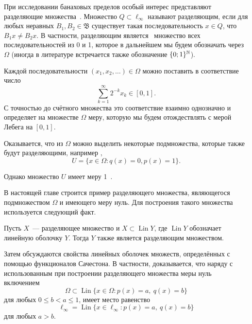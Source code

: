 При исследовании банаховых пределов особый интерес представляют разделяющие множества~\cite[\S 3]{Semenov2014geomprops}.
Множество $Q\subset\ell_\infty$ называют разделяющим, если
для любых неравных $B_1, B_2\in\mathfrak{B}$ существует такая последовательность $x\in Q$,
что $B_1 x \neq B_2 x$.
В частности, разделяющим является~\cite{semenov2010characteristic} множество всех последовательностей из 0 и 1,
которое в дальнейшем мы будем обозначать через $\Omega$
(иногда в литературе встречается также обозначение $\{0;1\}^{\mathbb{N}}$).

Каждой последовательности $(x_1, x_2, \dots)\in \Omega$ можно поставить в соответствие число
\begin{equation}\label{eq:bijection_omega_0_1}
	\sum_{k=1}^\infty 2^{-k} x_k \in [0,1]
	.
\end{equation}
С точностью до счётного множества это соответствие взаимно однозначно и определяет на множестве $\Omega$ меру,
которую мы будем отождествлять с мерой Лебега на $[0,1]$.

Оказывается, что из $\Omega$ можно выделить некоторые подмножества, которые также будут разделяющими,
например \cite[\S 3, Теорема 11]{Semenov2014geomprops},
\begin{equation}
	U = \{ x\in\Omega: q(x) = 0, p(x) = 1 \}
	.
\end{equation}

Однако множество $U$ имеет меру 1~\cite{semenov2010characteristic}.

В настоящей главе строится пример разделяющего множества,
являющегося подмножеством $\Omega$ и имеющего меру нуль.
Для построения такого множества используется следующий факт.

\begin{lemma}
	Пусть $X$~--- разделяющее множество и $X \subset \operatorname{Lin} Y$,
	где $\operatorname{Lin} Y$ обозначает линейную оболочку $Y$.
	Тогда $Y$ также является разделяющим множеством.
\end{lemma}

Затем обсуждаются свойства линейных оболочек множеств, определённых с помощью функционалов Сачестона.
В частности, доказывается,
что наряду с использованным при построении разделяющего множества меры нуль включением
\begin{equation}
	\Omega \subset \operatorname{Lin}\{x\in\Omega : p(x) = a,~ q(x) = b\}
\end{equation}
для любых $0\leq b < a \leq 1$,
имеет место равенство
\begin{equation}
	\ell_\infty = \operatorname{Lin}\{x\in\ell_\infty : p(x) = a,~ q(x) = b\}
\end{equation}
для любых $a>b$.

